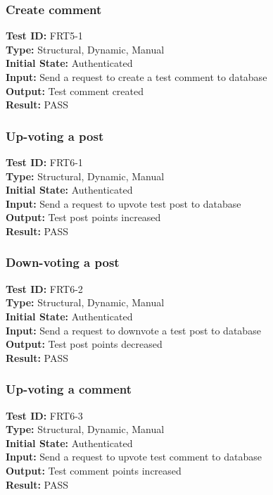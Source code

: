 \documentclass[12pt,fleqn]{article}
\begin{document}
\subsubsection{Create comment}
\textbf{Test ID:} FRT5-1\\
\textbf{Type:} Structural, Dynamic, Manual\\
\textbf{Initial State:} Authenticated\\
\textbf{Input:} Send a request to create a test comment to database\\
\textbf{Output:} Test comment created\\
\textbf{Result:} PASS
\newpage
\subsubsection{Up-voting a post}
\textbf{Test ID:} FRT6-1\\
\textbf{Type:} Structural, Dynamic, Manual\\
\textbf{Initial State:} Authenticated\\
\textbf{Input:} Send a request to upvote test post to database\\
\textbf{Output:} Test post points increased\\
\textbf{Result:} PASS

\subsubsection{Down-voting a post}
\textbf{Test ID:} FRT6-2\\
\textbf{Type:} Structural, Dynamic, Manual\\
\textbf{Initial State:} Authenticated\\
\textbf{Input:} Send a request to downvote a test post to database\\
\textbf{Output:} Test post points decreased\\
\textbf{Result:} PASS

\subsubsection{Up-voting a comment}
\textbf{Test ID:} FRT6-3\\
\textbf{Type:} Structural, Dynamic, Manual\\
\textbf{Initial State:} Authenticated\\
\textbf{Input:} Send a request to upvote test comment to database\\
\textbf{Output:} Test comment points increased\\
\textbf{Result:} PASS
\end{document}
